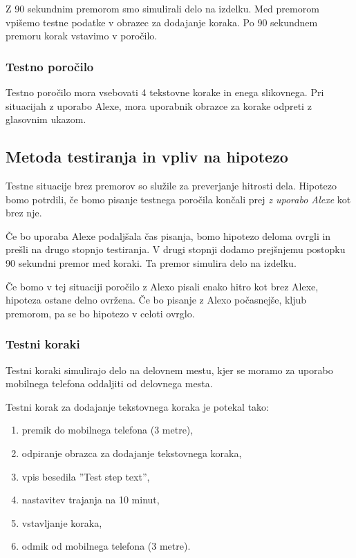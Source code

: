 \documentclass[a4paper, 12pt]{book}
\begin{document}
Z 90 sekundnim premorom smo simulirali delo na izdelku.
Med premorom vpišemo testne podatke v obrazec za dodajanje koraka.
Po 90 sekundnem premoru korak vstavimo v poročilo.

\subsubsection{Testno poročilo}
Testno poročilo mora vsebovati 4 tekstovne korake in enega slikovnega.
Pri situacijah z uporabo Alexe, mora uporabnik obrazce za korake odpreti z glasovnim ukazom.

\subsection{Metoda testiranja in vpliv na hipotezo}

Testne situacije brez premorov so služile za preverjanje hitrosti dela.
Hipotezo bomo potrdili, če bomo pisanje testnega poročila končali prej \emph{z uporabo Alexe} kot brez nje.

Če bo uporaba Alexe podaljšala čas pisanja, bomo hipotezo deloma ovrgli in prešli na drugo stopnjo testiranja.
V drugi stopnji dodamo prejšnjemu postopku 90 sekundni premor med koraki.
Ta premor simulira delo na izdelku.

Če bomo v tej situaciji poročilo z Alexo pisali enako hitro kot brez Alexe, hipoteza ostane delno ovržena.
Če bo pisanje z Alexo počasnejše, kljub premorom, pa se bo hipotezo v celoti ovrglo.

\subsubsection{Testni koraki}

Testni koraki simulirajo delo na delovnem mestu, kjer se moramo za uporabo mobilnega telefona oddaljiti od delovnega mesta.

Testni korak za dodajanje tekstovnega koraka je potekal tako:
\begin{enumerate}
	\item premik do mobilnega telefona (3 metre),
	\item odpiranje obrazca za dodajanje tekstovnega koraka,
	\item vpis besedila ''Test step text'',
	\item nastavitev trajanja na 10 minut,
	\item vstavljanje koraka,
	\item odmik od mobilnega telefona (3 metre).
\end{enumerate}
\end{document}
